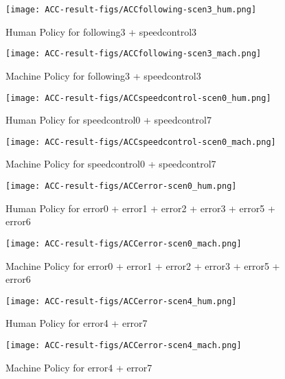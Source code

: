 \begin{figure}[h]
    \centering
    \texttt{[image: ACC-result-figs/ACCfollowing-scen3\_hum.png]}
    \caption{Human Policy for following3 + speedcontrol3}
    \label{fig:following-s3-hum}
\end{figure}

\begin{figure}[h]
    \centering
    \texttt{[image: ACC-result-figs/ACCfollowing-scen3\_mach.png]}
    \caption{Machine Policy for following3 + speedcontrol3}
    \label{fig:following-s3-mach}
\end{figure}

\begin{figure}[h]
    \centering
    \texttt{[image: ACC-result-figs/ACCspeedcontrol-scen0\_hum.png]}
    \caption{Human Policy for speedcontrol0 + speedcontrol7}
    \label{fig:speedcontrol-s0-hum}
\end{figure}

\begin{figure}[h]
    \centering
    \texttt{[image: ACC-result-figs/ACCspeedcontrol-scen0\_mach.png]}
    \caption{Machine Policy for speedcontrol0 + speedcontrol7}
    \label{fig:speedcontrol-s0-mach}
\end{figure}

\begin{figure}[h]
    \centering
    \texttt{[image: ACC-result-figs/ACCerror-scen0\_hum.png]}
    \caption{Human Policy for error0 + error1 + error2 + error3 + error5 + error6}
    \label{fig:error-s0-hum}
\end{figure}

\begin{figure}[h]
    \centering
    \texttt{[image: ACC-result-figs/ACCerror-scen0\_mach.png]}
    \caption{Machine Policy for error0 + error1 + error2 + error3 + error5 + error6}
    \label{fig:error-s0-mach}
\end{figure}

\begin{figure}[h]
    \centering
    \texttt{[image: ACC-result-figs/ACCerror-scen4\_hum.png]}
    \caption{Human Policy for error4 + error7}
    \label{fig:error-s4-hum}
\end{figure}

\begin{figure}[h]
    \centering
    \texttt{[image: ACC-result-figs/ACCerror-scen4\_mach.png]}
    \caption{Machine Policy for error4 + error7}
    \label{fig:error-s4-mach}
\end{figure}

